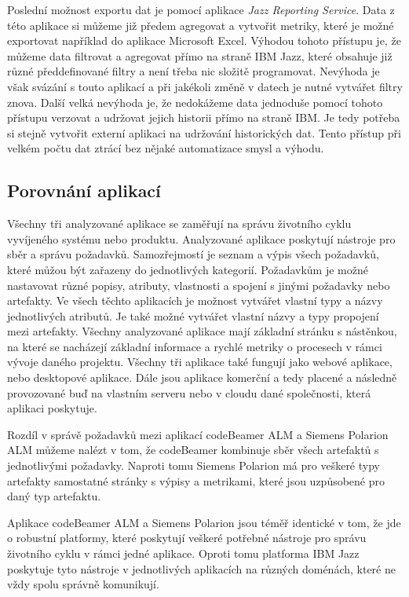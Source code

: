 \documentclass[czech,master,public,dept460,male,cpdeclaration,oneside]{diploma}
\begin{document}
Poslední možnost exportu dat je pomocí aplikace \textit{Jazz Reporting Service}. Data z této aplikace si můžeme již předem agregovat a vytvořit metriky, které je možné exportovat například do aplikace Microsoft Excel. Výhodou tohoto přístupu je, že můžeme data filtrovat a agregovat přímo na straně IBM Jazz, které obsahuje již různé předdefinované filtry a není třeba nic složitě programovat. Nevýhoda je však svázání s touto aplikací a při jakékoli změně v datech je nutné vytvářet filtry znova. Další velká nevýhoda je, že nedokážeme data jednoduše pomocí tohoto přístupu verzovat a udržovat jejich historii přímo na straně IBM. Je tedy potřeba si stejně vytvořit externí aplikaci na udržování historických dat. Tento přístup při velkém počtu dat ztrácí bez nějaké automatizace smysl a výhodu. 

\subsection{Porovnání aplikací}
Všechny tři analyzované aplikace se zaměřují na správu životního cyklu vyvíjeného systému nebo produktu. Analyzované aplikace poskytují nástroje pro sběr a správu požadavků. Samozřejmostí je seznam a výpis všech požadavků, které můžou být zařazeny do jednotlivých kategorií. Požadavkům je možné nastavovat různé popisy, atributy, vlastnosti a spojení s jinými požadavky nebo artefakty. Ve všech těchto aplikacích je možnost vytvářet vlastní typy a názvy jednotlivých atributů. Je také možné vytvářet vlastní názvy a typy propojení mezi artefakty. Všechny analyzované aplikace mají základní stránku s nástěnkou, na které se nacházejí základní informace a rychlé metriky o procesech v rámci vývoje daného projektu. Všechny tři aplikace také fungují jako webové aplikace, nebo desktopové aplikace. Dále jsou aplikace komerční a tedy placené a následně provozované buď na vlastním serveru nebo v cloudu dané společnosti, která aplikaci poskytuje.

Rozdíl v správě požadavků mezi aplikací codeBeamer ALM a Siemens Polarion ALM můžeme nalézt v tom, že codeBeamer kombinuje sběr všech artefaktů s jednotlivými požadavky. Naproti tomu Siemens Polarion má pro veškeré typy artefakty samostatné stránky s výpisy a metrikami, které jsou uzpůsobené pro daný typ artefaktu.

Aplikace codeBeamer ALM a Siemens Polarion jsou téměř identické v tom, že jde o robustní platformy, které poskytují veškeré potřebné nástroje pro správu životního cyklu v rámci jedné aplikace. Oproti tomu platforma IBM Jazz poskytuje tyto nástroje v jednotlivých aplikacích na různých doménách, které ne vždy spolu správně komunikují.
\end{document}
